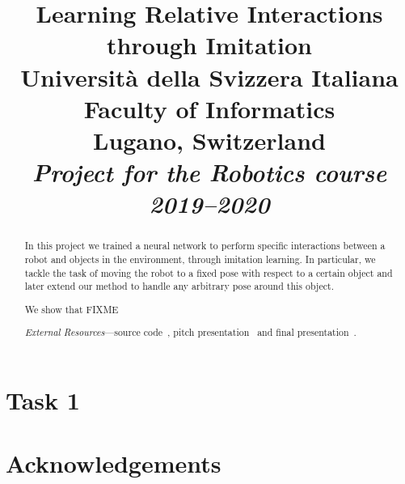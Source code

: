\documentclass[conference]{IEEEtran}
\begin{document}
\title{Learning Relative Interactions through Imitation \\ \vspace{0.5\baselineskip}
{
	\large {Università della Svizzera Italiana}\\
	{Faculty of Informatics} \\
	Lugano, Switzerland \\
	\textit{Project for the Robotics course 2019--2020}\\
}
}

\author{
\and
{}
}

\maketitle
\thispagestyle{plain}
\pagestyle{plain}

\begin{abstract}
In this project we trained a neural network to perform specific interactions 
between a robot and objects in the environment, through imitation learning. In 
particular, we tackle the task of moving the robot to a fixed pose with respect 
to a certain object and later extend our method to handle any arbitrary pose 
around this object.

We show that FIXME

\emph{External Resources}---source code~\cite{github}, pitch 
presentation~\cite{pitch} and final presentation~\cite{final-pitch}.

\end{abstract}





\section{Task 1}








\section*{Acknowledgements}




\end{document}
